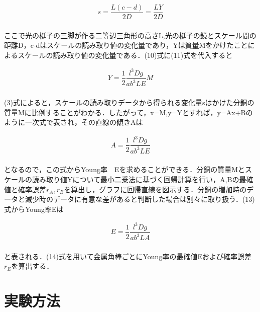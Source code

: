 \documentclass[a4paper,1pt]{jsarticle}
\begin{document}
  
  \begin{eqnarray}
    \label{tawami}
   s=\dfrac{L(c-d)}{2D}=\dfrac{LY}{2D}
  \end{eqnarray}
\\

  ここで光の梃子の三脚が作る二等辺三角形の高さL,光の梃子の鏡とスケール間の距離D，c-dはスケールの読み取り値の変化量であり，Yは質量Mをかけたことによるスケールの読み取り値の変化量である．(10)式に(11)式を代入すると

  \begin{eqnarray}
    \label{itizishiki}
    Y=\dfrac{1}{2}\dfrac{l^3Dg}{ab^3LE}M
  \end{eqnarray}
\\

(3)式によると，スケールの読み取りデータから得られる変化量sはかけた分銅の質量Mに比例することがわかる．したがって，x=M,y=Yとすれば，y=Ax+Bのように一次式で表され，その直線の傾きAは

\begin{eqnarray}
  \label{A}
  A=\dfrac{1}{2}\dfrac{l^3Dg}{ab^3LE}
\end{eqnarray}
\\

となるので，この式からYoung率　Eを求めることができる．分銅の質量Mとスケールの読み取り値Yについて最小二乗法に基づく回帰計算を行い，A,Bの最確値と確率誤差$r_A,r_B$を算出し，グラフに回帰直線を図示する．分銅の増加時のデータと減少時のデータに有意な差があると判断した場合は別々に取り扱う．(13)式からYoung率Eは

\begin{eqnarray}
  \label{E}
  E=\dfrac{1}{2}\dfrac{l^3Dg}{ab^3LA}
\end{eqnarray}
\\

と表される．(14)式を用いて金属角棒ごとにYoung率の最確値Eおよび確率誤差$r_E$を算出する．\\

\section{実験方法}
\end{document}
